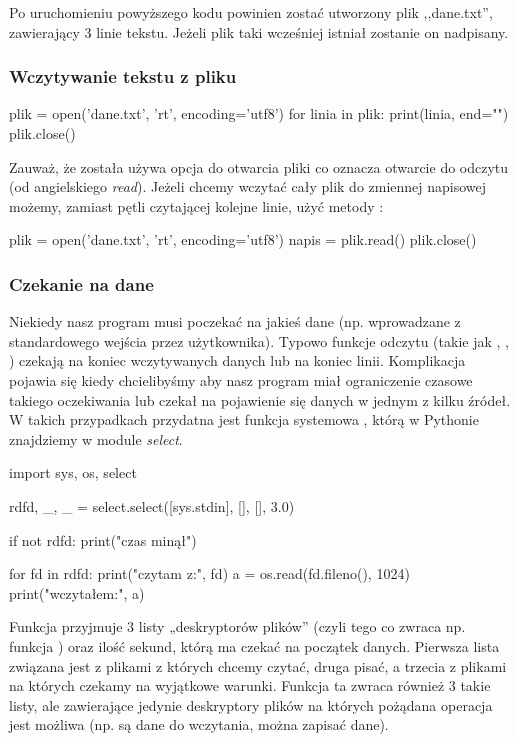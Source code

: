 \documentclass{pdfBooklets}
\begin{document}
Po uruchomieniu powyższego kodu powinien zostać utworzony plik ,,dane.txt'', zawierający 3 linie tekstu. Jeżeli plik taki wcześniej istniał zostanie on nadpisany.

\subsubsection{Wczytywanie tekstu z pliku}

\begin{CodeFrame*}[python]{}
plik = open('dane.txt', 'rt', encoding='utf8')
for linia in plik:
  print(linia, end="")
plik.close()
\end{CodeFrame*}

Zauważ, że została używa opcja  do otwarcia pliki co oznacza otwarcie do odczytu (od angielskiego \textit{read}). Jeżeli chcemy wczytać cały plik do zmiennej napisowej możemy, zamiast pętli czytającej kolejne linie, użyć metody :
\begin{CodeFrame*}[python]{}
plik = open('dane.txt', 'rt', encoding='utf8')
napis = plik.read()
plik.close()
\end{CodeFrame*}

\subsubsection{Czekanie na dane}

Niekiedy nasz program musi poczekać na jakieś dane (np. wprowadzane z standardowego wejścia przez użytkownika).
Typowo funkcje odczytu (takie jak , , ) czekają na koniec wczytywanych danych lub na koniec linii.
Komplikacja pojawia się kiedy chcielibyśmy aby nasz program miał ograniczenie czasowe takiego oczekiwania lub czekał na pojawienie się danych w jednym z kilku źródeł.
W takich przypadkach przydatna jest funkcja systemowa , którą w Pythonie znajdziemy w module \textit{select}.

\begin{CodeFrame*}[python]{}
import sys, os, select

rdfd, _, _ = select.select([sys.stdin], [], [], 3.0)

if not rdfd:
	print("czas minął")

for fd in rdfd:
	print("czytam z:", fd)
	a = os.read(fd.fileno(), 1024)
	print("wczytałem:", a)
\end{CodeFrame*}

Funkcja  przyjmuje 3 listy „deskryptorów plików” (czyli tego co zwraca np. funkcja ) oraz ilość sekund, którą ma czekać na początek danych. Pierwsza lista związana jest z plikami z których chcemy czytać, druga pisać, a trzecia z plikami na których czekamy na wyjątkowe warunki. Funkcja ta zwraca również 3 takie listy, ale zawierające jedynie deskryptory plików na których pożądana operacja jest możliwa (np. są dane do wczytania, można zapisać dane).
\end{document}

